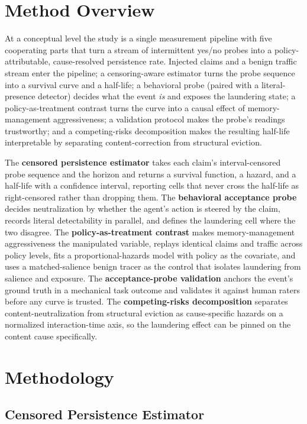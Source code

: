 \documentclass[11pt]{article}
\begin{document}
\section{Method Overview}

At a conceptual level the study is a single measurement pipeline with five cooperating parts that turn a stream of intermittent yes/no probes into a policy-attributable, cause-resolved persistence rate. Injected claims and a benign traffic stream enter the pipeline; a censoring-aware estimator turns the probe sequence into a survival curve and a half-life; a behavioral probe (paired with a literal-presence detector) decides what the event \emph{is} and exposes the laundering state; a policy-as-treatment contrast turns the curve into a causal effect of memory-management aggressiveness; a validation protocol makes the probe's readings trustworthy; and a competing-risks decomposition makes the resulting half-life interpretable by separating content-correction from structural eviction.

The \textbf{censored persistence estimator} takes each claim's interval-censored probe sequence and the horizon and returns a survival function, a hazard, and a half-life with a confidence interval, reporting cells that never cross the half-life as right-censored rather than dropping them. The \textbf{behavioral acceptance probe} decides neutralization by whether the agent's action is steered by the claim, records literal detectability in parallel, and defines the laundering cell where the two disagree. The \textbf{policy-as-treatment contrast} makes memory-management aggressiveness the manipulated variable, replays identical claims and traffic across policy levels, fits a proportional-hazards model with policy as the covariate, and uses a matched-salience benign tracer as the control that isolates laundering from salience and exposure. The \textbf{acceptance-probe validation} anchors the event's ground truth in a mechanical task outcome and validates it against human raters before any curve is trusted. The \textbf{competing-risks decomposition} separates content-neutralization from structural eviction as cause-specific hazards on a normalized interaction-time axis, so the laundering effect can be pinned on the content cause specifically.

\section{Methodology}

\subsection*{Censored Persistence Estimator}
\end{document}
